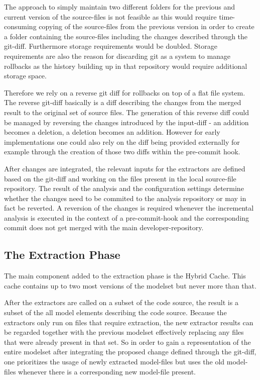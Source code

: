 \documentclass[a4paper]{article}
\begin{document}
The approach to simply maintain two different folders for the previous and current version of the source-files is  not feasible as this would require time-consuming copying of the source-files from the previous version in order to create a folder containing the source-files including the changes described through the git-diff. Furthermore storage requirements would be doubled. Storage requirements are also the reason for discarding git as a system to manage rollbacks as the history building up in that repository would require additional storage space.

Therefore we rely on a reverse git diff for rollbacks on top of a flat file system. The reverse git-diff basically is a diff describing the changes from the merged result to the original set of source files. The generation of this reverse diff could be managed by reversing the changes introduced by the input-diff - an addition becomes a deletion, a deletion becomes an addition. However for early implementations one could also rely on the diff being provided externally for example through the creation of those two diffs within the pre-commit hook.

After changes are integrated, the relevant inputs for the extractors are defined based on the git-diff and working on the files present in the local source-file repository. The result of the analysis and the configuration settings determine whether the changes need to be commited to the analysis repository or may in fact be reverted. A reversion of the changes is required whenever the incremental analysis is executed in the context of a pre-commit-hook and the corresponding commit does not get merged with the main developer-repository.

\subsection{The Extraction Phase}

The main component added to the extraction phase is the Hybrid Cache. This cache contains up to two most versions of the modelset but never more than that.

After the extractors are called on a subset of the code source, the result is a subset of the all model elements describing the code source. Because the extractors only run on files that require extraction, the new extractor results can be regarded together with the previous modelset effectively replacing any files that were already present in that set. So in order to gain a representation of the entire modelset after integrating the proposed change defined through the git-diff, one prioritizes the usage of newly extracted model-files but uses the old model-files whenever there is a corresponding new model-file present.
\end{document}
